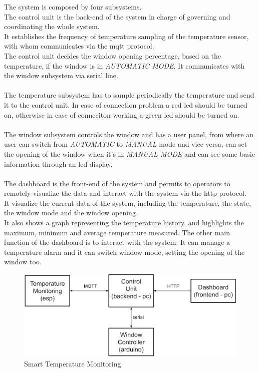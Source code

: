 \documentclass[a4paper,12pt]{report}
\begin{document}
        The system is composed by four subsystems.\\
        The control unit is the back-end of the system in charge of governing and coordinating the whole system.\\
        It establishes the frequency of temperature sampling of the temperature sensor, with whom communicates via
        the mqtt protocol.\\        
        The control unit decides the window opening percentage, based on the temperature,
        if the window is in \textit{AUTOMATIC MODE}.
        It communicates with the window subsystem via serial line. \\\\
        The temperature subsystem has to sample periodically the temperature and send it to the control unit.
        In case of connection problem a red led should be turned on, otherwise in case of conneciton working a green led
        should be turned on.\\\\
        The window subsystem controls the window and has a user panel, from where an user can switch from \textit{AUTOMATIC} to
        \textit{MANUAL} mode and vice versa, can set the opening of the window when it's in \textit{MANUAL MODE} and can see some
        basic information through an lcd display.\\\\
        The dashboard is the front-end of the system and permits to operators to remotely visualize the data and interact
        with the system via the http protocol. \\
        It visualize the current data of the system, including the temperature, the state, the window mode and the window opening.\\
        It also shows a graph representing the temperature history, and highlights the maximum, minimum and average
        temperature measured.
        The other main function of the dashboard is to interact with the system.
        It can manage a temperature alarm and it can switch window mode, setting the opening of the window too.

        \begin{figure}[H]
            \centering{}
            \includegraphics[width=350pt]{report/img/Assignment-03_SMT-Domain.png}
            \caption{Smart Temperature Monitoring}
            \label{img:system}
        \end{figure}
\end{document}
